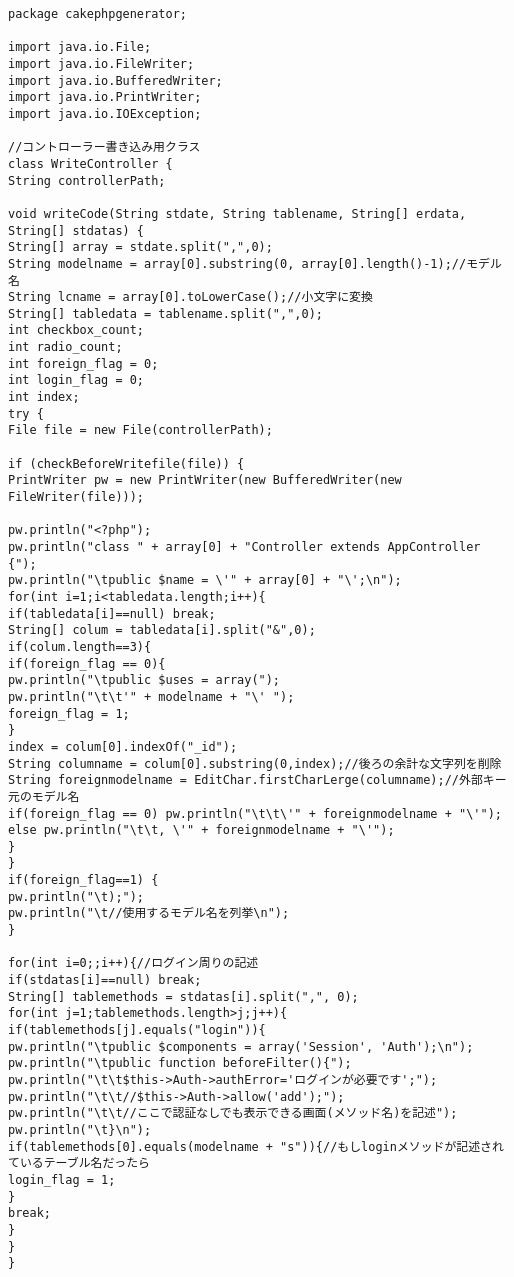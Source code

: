 \documentclass{funthesis}
\begin{document}
\begin{lstlisting}[caption=WriteController .java,label=1]
package cakephpgenerator;

import java.io.File;
import java.io.FileWriter;
import java.io.BufferedWriter;
import java.io.PrintWriter;
import java.io.IOException;

//コントローラー書き込み用クラス
class WriteController {
String controllerPath;

void writeCode(String stdate, String tablename, String[] erdata, String[] stdatas) {
String[] array = stdate.split(",",0);
String modelname = array[0].substring(0, array[0].length()-1);//モデル名
String lcname = array[0].toLowerCase();//小文字に変換
String[] tabledata = tablename.split(",",0);
int checkbox_count;
int radio_count;
int foreign_flag = 0;
int login_flag = 0;
int index;
try {
File file = new File(controllerPath);

if (checkBeforeWritefile(file)) {
PrintWriter pw = new PrintWriter(new BufferedWriter(new FileWriter(file)));

pw.println("<?php");
pw.println("class " + array[0] + "Controller extends AppController {");
pw.println("\tpublic $name = \'" + array[0] + "\';\n");
for(int i=1;i<tabledata.length;i++){
if(tabledata[i]==null) break;
String[] colum = tabledata[i].split("&",0);
if(colum.length==3){
if(foreign_flag == 0){
pw.println("\tpublic $uses = array(");
pw.println("\t\t'" + modelname + "\' ");
foreign_flag = 1;
}
index = colum[0].indexOf("_id");
String columname = colum[0].substring(0,index);//後ろの余計な文字列を削除
String foreignmodelname = EditChar.firstCharLerge(columname);//外部キー元のモデル名
if(foreign_flag == 0) pw.println("\t\t\'" + foreignmodelname + "\'");
else pw.println("\t\t, \'" + foreignmodelname + "\'");
}
}
if(foreign_flag==1) {
pw.println("\t);");
pw.println("\t//使用するモデル名を列挙\n");
}

for(int i=0;;i++){//ログイン周りの記述
if(stdatas[i]==null) break;
String[] tablemethods = stdatas[i].split(",", 0);
for(int j=1;tablemethods.length>j;j++){
if(tablemethods[j].equals("login")){
pw.println("\tpublic $components = array('Session', 'Auth');\n");
pw.println("\tpublic function beforeFilter(){");
pw.println("\t\t$this->Auth->authError='ログインが必要です';");
pw.println("\t\t//$this->Auth->allow('add');");
pw.println("\t\t//ここで認証なしでも表示できる画面(メソッド名)を記述");
pw.println("\t}\n");
if(tablemethods[0].equals(modelname + "s")){//もしloginメソッドが記述されているテーブル名だったら
login_flag = 1;
}
break;
}
}
}


\end{lstlisting}
\end{document}
